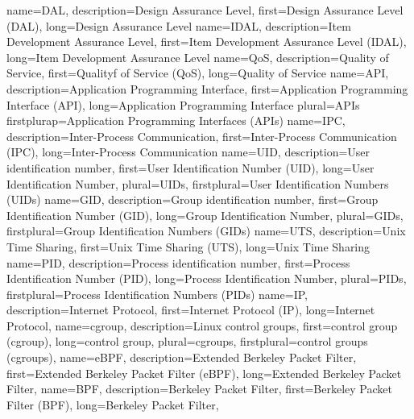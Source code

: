 {%
    name={DAL},
    description={Design Assurance Level},
    first={Design Assurance Level (DAL)},
    long={Design Assurance Level}
}
{%
    name={IDAL},
    description={Item Development Assurance Level},
    first={Item Development Assurance Level (IDAL)},
    long={Item Development Assurance Level}
}
{%
    name={QoS},
    description={Quality of Service},
    first={Qualityf of Service (QoS)},
    long={Quality of Service}
}
{%
    name={API},
    description={Application Programming Interface},
    first={Application Programming Interface (API)},
    long={Application Programming Interface}
    plural={APIs}
    firstplurap={Application Programming Interfaces (APIs)}
}
{%
    name={IPC},
    description={Inter-Process Communication},
    first={Inter-Process Communication (IPC)},
    long={Inter-Process Communication}
}
{%
    name={UID},
    description={User identification number},
    first={User Identification Number (UID)},
    long={User Identification Number},
    plural={UIDs},
    firstplural={User Identification Numbers (UIDs)}
}
{%
    name={GID},
    description={Group identification number},
    first={Group Identification Number (GID)},
    long={Group Identification Number},
    plural={GIDs},
    firstplural={Group Identification Numbers (GIDs)}
}
{%
    name={UTS},
    description={Unix Time Sharing},
    first={Unix Time Sharing (UTS)},
    long={Unix Time Sharing}
}
{%
    name={PID},
    description={Process identification number},
    first={Process Identification Number (PID)},
    long={Process Identification Number},
    plural={PIDs},
    firstplural={Process Identification Numbers (PIDs)}
}
{%
    name={IP},
    description={Internet Protocol},
    first={Internet Protocol (IP)},
    long={Internet Protocol},
}
{%
    name={cgroup},
    description={Linux control groups},
    first={control group (cgroup)},
    long={control group},
    plural={cgroups},
    firstplural={control groups (cgroups)},
}
{%
    name={eBPF},
    description={Extended Berkeley Packet Filter},
    first={Extended Berkeley Packet Filter (eBPF)},
    long={Extended Berkeley Packet Filter},
}
{%
    name={BPF},
    description={Berkeley Packet Filter},
    first={Berkeley Packet Filter (BPF)},
    long={Berkeley Packet Filter},
}

